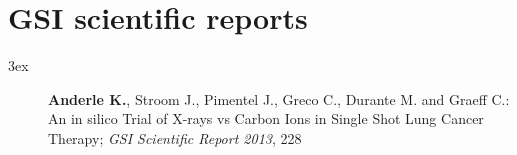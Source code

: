 \section*{GSI scientific reports}
\begin{setlength}{\leftmargini}{3ex}
  \begin{description}
    \item[] \textbf{Anderle K.}, Stroom J., Pimentel J., Greco C., Durante M. and Graeff C.: An in silico Trial of X-rays vs Carbon Ions in Single Shot Lung Cancer Therapy; \textit{GSI Scientific Report 2013}, 228
  \end{description}
\end{setlength}



